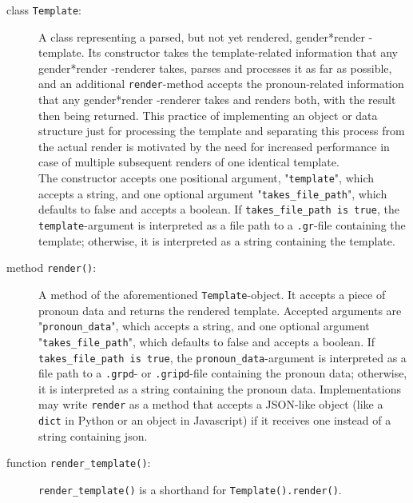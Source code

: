 \documentclass{article}
\newcommand{\GenderRender}{
    gender*render
}
\begin{document}
    \begin{description}
        \item[class \texttt{Template}:] A class representing a parsed, but not yet rendered, \GenderRender-template.
                                         Its constructor takes the template-related information that any \GenderRender-renderer takes, parses and processes it as far as possible, and an additional \texttt{render}-method accepts the pronoun-related information that any \GenderRender-renderer takes and renders both, with the result then being returned.
                                         This practice of implementing an object or data structure just for processing the template and separating this process from the actual render is motivated by the need for increased performance in case of multiple subsequent renders of one identical template.\\
                                         The constructor accepts one positional argument, "\texttt{template}", which accepts a string, and one optional argument "\texttt{takes\_file\_path}", which defaults to false and accepts a boolean.
                                         If \texttt{takes\_file\_path is true}, the \texttt{template}-argument is interpreted as a file path to a \texttt{.gr}-file containing the template;
                                         otherwise, it is interpreted as a string containing the template.
        \item[method \texttt{render()}:] A method of the aforementioned \texttt{Template}-object.
                                        It accepts a piece of pronoun data and returns the rendered template.
                                        Accepted arguments are "\texttt{pronoun\_data}", which accepts a string, and one optional argument "\texttt{takes\_file\_path}", which defaults to false and accepts a boolean.
                                        If \texttt{takes\_file\_path is true}, the \texttt{pronoun\_data}-argument is interpreted as a file path to a \texttt{.grpd}- or \texttt{.gripd}-file containing the pronoun data;
                                        otherwise, it is interpreted as a string containing the pronoun data.
                                        Implementations may write \texttt{render} as a method that accepts a JSON-like object (like a \texttt{dict} in Python or an object in Javascript) if it receives one instead of a string containing json.
        \item[function \texttt{render\_template()}:] \texttt{render\_template()} is a shorthand for \texttt{Template().render()}.

\end{description}
\end{document}
